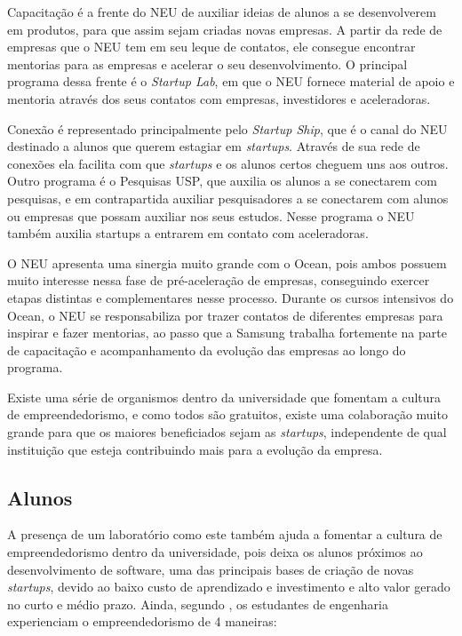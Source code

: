 Capacitação é a frente do NEU de auxiliar ideias de alunos a se desenvolverem em produtos, para que assim sejam criadas novas empresas. A partir da rede de empresas que o NEU tem em seu leque de contatos, ele consegue encontrar mentorias para as empresas e acelerar o seu desenvolvimento. O principal programa dessa frente é o \textit{Startup Lab}, em que o NEU fornece material de apoio e mentoria através dos seus contatos com empresas, investidores e aceleradoras.

Conexão é representado principalmente pelo \textit{Startup Ship}, que é o canal do NEU destinado a alunos que querem estagiar em \textit{startups}. Através de sua rede de conexões ela facilita com que \textit{startups} e os alunos certos cheguem uns aos outros. Outro programa é o Pesquisas USP, que auxilia os alunos a se conectarem com pesquisas, e em contrapartida auxiliar pesquisadores a se conectarem com alunos ou empresas que possam auxiliar nos seus estudos. Nesse programa o NEU também auxilia startups a entrarem em contato com aceleradoras.

O NEU apresenta uma sinergia muito grande com o Ocean, pois ambos possuem muito interesse nessa fase de pré-aceleração de empresas, conseguindo exercer etapas distintas e complementares nesse processo. Durante os cursos intensivos do Ocean, o NEU se responsabiliza por trazer contatos de diferentes empresas para inspirar e fazer mentorias, ao passo que a Samsung trabalha fortemente na parte de capacitação e acompanhamento da evolução das empresas ao longo do programa.

Existe uma série de organismos dentro da universidade que fomentam a cultura de empreendedorismo, e como todos são gratuitos, existe uma colaboração muito grande para que os maiores beneficiados sejam as \textit{startups}, independente de  qual instituição que esteja contribuindo mais para a evolução da empresa.

\subsection{Alunos}
\label{sec:con_alunos}

A presença de um laboratório como este também ajuda a fomentar a cultura de empreendedorismo dentro da universidade, pois deixa os alunos próximos ao desenvolvimento de software, uma das principais bases de criação de novas \textit{startups}, devido ao baixo custo de aprendizado e investimento e alto valor gerado no curto e médio prazo. Ainda, segundo , os estudantes de engenharia experienciam o empreendedorismo de 4 maneiras: 

